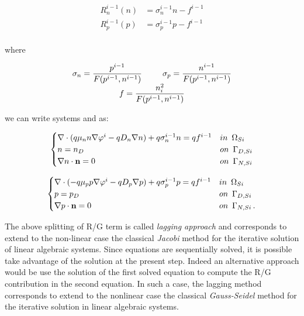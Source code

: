 \begin{equation}
\label{eq: real Rn and Rp}
\begin{array}{rcl}
R_n^{i-1}(n) & = \sigma_n^{i-1} n - f^{i-1} \\
R_p^{i-1}(p) & = \sigma_p^{i-1} p - f^{i-1} \\
\end{array}
\end{equation}

where


\begin{equation}
\begin{array}{c}
\sigma_n  = \dfrac{p^{i-1}}{F(p^{i-1},n^{i-1})} \psp{15} \sigma_p   = \dfrac{n^{i-1}}{F(p^{i-1},n^{i-1})} \\
f  = \dfrac{n_i^2}{F(p^{i-1},n^{i-1})}
\end{array}
\end{equation}

we can write systems  and  as:

\begin{equation}
\label{eq: LEC system new}
\begin{cases}
 \nabla \cdot ( q\mu_n n \nabla \varphi^i - qD_n \nabla n ) +q\sigma_n^{i-1} n = qf^{i-1} & in \psp{3} \Omega_{Si}
 \\
 n = n_D & on \psp{3} \Gamma_{D,Si}
 \\
 \nabla n \cdot \vect{n} = 0 & on \psp{3} \Gamma_{N,Si}
\end{cases}
\end{equation}

\begin{equation}
\label{eq: LHC system new}
\begin{cases}
\nabla \cdot (- q\mu_p p \nabla \varphi^i - qD_p \nabla p ) + q\sigma_p^{i-1} p =  qf^{i-1}& in \psp{3} \Omega_{Si}
\\
 p = p_D & on \psp{3} \Gamma_{D,Si}
 \\
 \nabla p \cdot \vect{n} = 0 & on \psp{3} \Gamma_{N,Si}\, .
\end{cases}
\end{equation}


The above splitting of R/G term is called \textit{lagging approach} \cite{Jerome:AnalyCharTran} and corresponds to extend to the non-linear case the classical \textit{Jacobi} method for the iterative  solution of linear algebraic systems. Since equations are sequentially solved, it is possible take advantage of the solution at the present step. Indeed an alternative approach would be use the solution of the first solved equation to compute the R/G contribution in the second equation. In such a case, the lagging method corresponds to extend to the nonlinear case the classical \textit{Gauss-Seidel} method for the iterative solution in linear algebraic systems.


